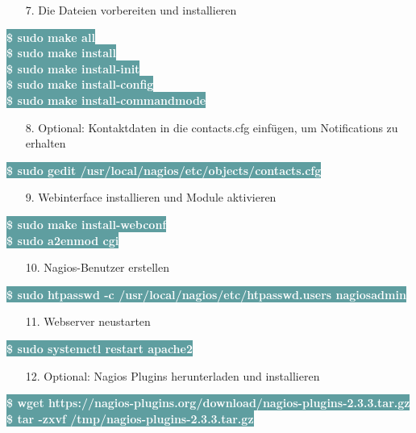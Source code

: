 \documentclass[fontsize=12pt,paper=a4,open=any,parskip=half,
  twoside=false,toc=listof,toc=bibliography,fleqn,leqno,
  captions=nooneline,captions=tableabove,british]{scrbook}
\begin{document}
\begin{itemize}
\item[7.] Die Dateien vorbereiten und installieren
\end{itemize}
\colorbox{CadetBlue}{\textcolor{white}{\textbf{\textsf{\$ sudo make all}}}}\\
\colorbox{CadetBlue}{\textcolor{white}{\textbf{\textsf{\$ sudo make install}}}}\\
\colorbox{CadetBlue}{\textcolor{white}{\textbf{\textsf{\$ sudo make install-init}}}}\\
\colorbox{CadetBlue}{\textcolor{white}{\textbf{\textsf{\$ sudo make install-config}}}}\\
\colorbox{CadetBlue}{\textcolor{white}{\textbf{\textsf{\$ sudo make install-commandmode}}}}
\begin{itemize}
\item[8.] Optional: Kontaktdaten in die contacts.cfg einfügen, um Notifications zu erhalten
\end{itemize}
\colorbox{CadetBlue}{\textcolor{white}{\textbf{\textsf{\$ sudo gedit /usr/local/nagios/etc/objects/contacts.cfg}}}}
\begin{itemize}
\item[9.] Webinterface installieren und Module aktivieren
\end{itemize}
\colorbox{CadetBlue}{\textcolor{white}{\textbf{\textsf{\$ sudo make install-webconf}}}}\\
\colorbox{CadetBlue}{\textcolor{white}{\textbf{\textsf{\$ sudo a2enmod cgi}}}}
\begin{itemize}
\item[10.] Nagios-Benutzer erstellen
\end{itemize}
\colorbox{CadetBlue}{\textcolor{white}{\textbf{\textsf{\$ sudo htpasswd -c /usr/local/nagios/etc/htpasswd.users nagiosadmin}}}}
\begin{itemize}
\item[11.] Webserver neustarten
\end{itemize}
\colorbox{CadetBlue}{\textcolor{white}{\textbf{\textsf{\$ sudo systemctl restart apache2}}}}
\begin{itemize}
\item[12.] Optional: Nagios Plugins herunterladen und installieren
\end{itemize}
\colorbox{CadetBlue}{\textcolor{white}{\textbf{\textsf{\$ wget https://nagios-plugins.org/download/nagios-plugins-2.3.3.tar.gz}}}}\\
\colorbox{CadetBlue}{\textcolor{white}{\textbf{\textsf{\$ tar -zxvf /tmp/nagios-plugins-2.3.3.tar.gz}}}}\\
\end{document}
